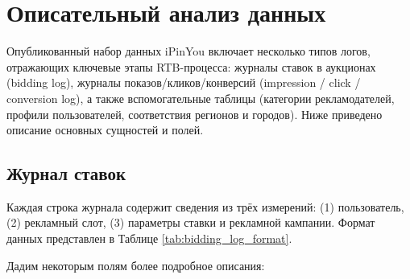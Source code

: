 \section{Описательный анализ данных}

Опубликованный набор данных iPinYou включает несколько типов логов, отражающих ключевые этапы RTB-процесса: журналы ставок в аукционах (bidding log), журналы показов/кликов/конверсий (impression / click / conversion log), а также вспомогательные таблицы (категории рекламодателей, профили пользователей, соответствия регионов и городов). Ниже приведено описание основных сущностей и полей.

\subsection{Журнал ставок}
Каждая строка журнала содержит сведения из трёх измерений: (1) пользователь, (2) рекламный слот, (3) параметры ставки и рекламной кампании. Формат данных представлен в Таблице \ref{tab:bidding_log_format}.

Дадим некоторым полям более подробное описания:

